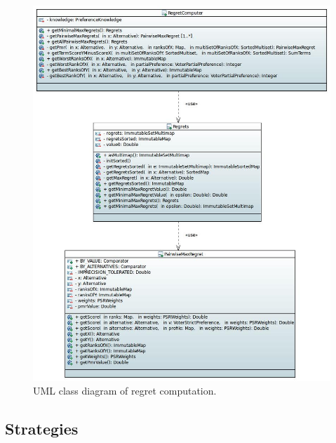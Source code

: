\begin{figure}
	\centering
	\includegraphics[width=\textwidth]{uml/regret.jpeg}
	\caption{UML class diagram of regret computation.}
	\label{uml:regret}
\end{figure}


\subsection{Strategies}

